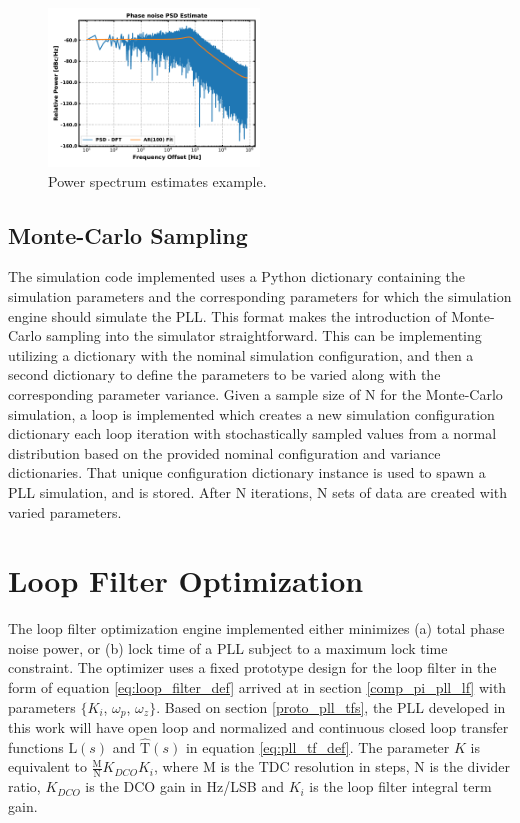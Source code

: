 	\begin{figure}[htb!]
		\center\includegraphics[width=0.5\textwidth, angle=0]{figs/psd_estimate.pdf}
		\caption{Power spectrum estimates example.}
		\label{fig:psd_est}
	\end{figure}
	\FloatBarrier

\subsection{Monte-Carlo Sampling}
The simulation code implemented uses a Python dictionary containing the simulation parameters and the corresponding parameters for which the simulation engine should simulate the PLL. This format makes the introduction of Monte-Carlo sampling into the simulator straightforward. This can be implementing utilizing a dictionary with the nominal simulation configuration, and then a second dictionary to define the parameters to be varied along with the corresponding parameter variance. Given a sample size of N for the Monte-Carlo simulation, a loop is implemented which creates a new simulation configuration dictionary each loop iteration with stochastically sampled values from a normal distribution based on the provided nominal configuration and variance dictionaries. That unique configuration dictionary instance is used to spawn a PLL simulation, and is stored. After N iterations, N sets of data are created with varied parameters.



\pagebreak
\section{Loop Filter Optimization}\label{methods_lf_opt}
The loop filter optimization engine implemented either minimizes (a) total phase noise power, or (b) lock time of a PLL subject to a maximum lock time constraint. The optimizer uses a fixed prototype design for the loop filter in the form of equation \ref{eq:loop_filter_def} arrived at in section \ref{comp_pi_pll_lf} with parameters $\{K_i$, $\omega_p$, $\omega_z\}$. Based on section \ref{proto_pll_tfs}, the PLL developed in this work will have open loop and normalized and continuous closed loop transfer functions $\mathrm{L}(s)$ and $\mathrm{\hat{T}}(s)$ in equation \ref{eq:pll_tf_def}. The parameter $K$ is equivalent to $\frac{\mathrm{M}}{\mathrm{N}}K_{DCO}K_i$, where M is the TDC resolution in steps, N is the divider ratio, $K_{DCO}$ is the DCO gain in Hz/LSB and $K_i$ is the loop filter integral term gain. 

